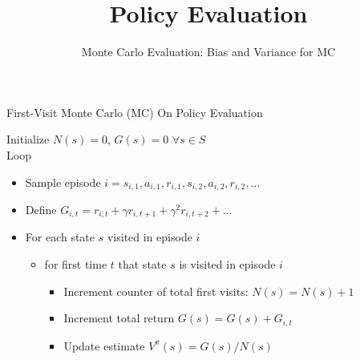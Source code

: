 \documentclass[aspectratio=169]{../latex_main/tntbeamer}  %
\title[Reinforcement Learning: Policy Evaluation]{Policy Evaluation}
\subtitle{Monte Carlo Evaluation: Bias and Variance for MC}
\begin{document}
	
	\maketitle

\begin{frame}[c]{First-Visit Monte Carlo (MC) On Policy Evaluation}

Initialize $N(s) = 0$, $G(s) = 0$ $\forall s \in S$\\
Loop 
\begin{itemize}
	\item Sample episode $i = s_{i,1}, a_{i,1}, r_{i,1}, s_{i,2}, a_{i,2}, r_{i,2}, \ldots$
	\item Define $G_{i,t} = r_{i,t} + \gamma r_{i,t+1} + \gamma^2 r_{i,t+2} + \ldots$
	\item For each state $s$ visited in episode $i$
	\begin{itemize}
		\item for first time $t$ that state $s$ is visited in episode $i$
		\begin{itemize}
			\item Increment counter of total first visits: $N(s) = N(s) + 1$
			\item Increment total return $G(s) = G(s) + G_{i,t}$
			\item Update estimate $V^\pi (s) = G(s) /N(s)$
		\end{itemize}
	\end{itemize}
\end{itemize}
	
\end{frame}
\end{document}

